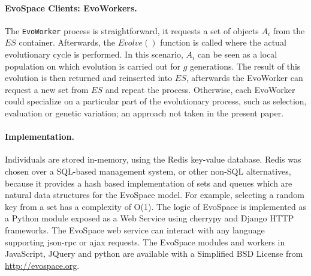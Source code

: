 \documentclass{llncs}
\begin{document}
\paragraph{EvoSpace Clients: EvoWorkers.}
The \texttt{EvoWorker} process is straightforward, it requests a set of objects $A_i$ from the $ES$ container.
Afterwards, the $Evolve()$ function is called where the actual evolutionary cycle is performed.
In this scenario, $A_i$ can be seen as a local population on which evolution is carried out for $g$ generations.
The result of this evolution is then returned and reinserted into $ES$, afterwards the EvoWorker can request a new set from $ES$ and repeat the process.
Otherwise, each EvoWorker could specialize on a particular part of the evolutionary process, such as selection, evaluation or genetic variation;
an approach not taken in the present paper.


\paragraph{Implementation.}
Individuals are stored in-memory, using the Redis key-value database.
Redis was chosen over a SQL-based management system, or other non-SQL alternatives, because it provides a hash based implementation of sets and queues which are natural data structures for the EvoSpace model. For example, selecting a random key from a set has a complexity of O(1). The logic of EvoSpace is implemented as a Python module exposed as a Web Service using cherrypy and Django HTTP frameworks. The EvoSpace web service can interact with any language supporting json-rpc or ajax requests. The EvoSpace modules and workers in JavaScript, JQuery and python are available with a Simplified BSD License from \url{http://evospace.org}.
\end{document}
